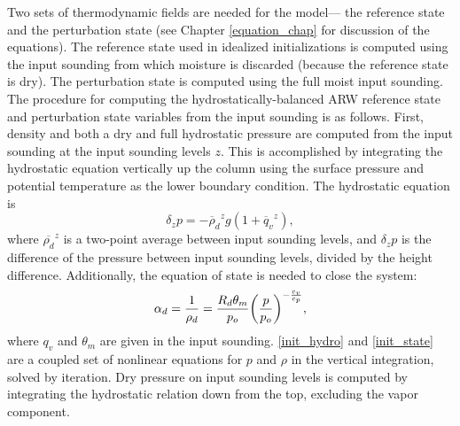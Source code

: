 Two sets of thermodynamic fields are needed for the model--- the
reference state and the perturbation state (see Chapter
\ref{equation_chap} for discussion of the equations).  The
reference state used in idealized initializations is computed using
the input sounding from which moisture is discarded (because the
reference state is dry).  The perturbation state is computed using the full
moist input sounding.  The procedure for computing the hydrostatically-balanced 
ARW reference state and perturbation state variables from the input
sounding is as follows.  First, density and both a dry and full
hydrostatic pressure are computed from the input sounding at the input
sounding levels $z$.  This is accomplished by integrating the
hydrostatic equation vertically up the column using the surface pressure
and potential temperature as the lower boundary condition.  The
hydrostatic equation is
% 
\begin{equation} \delta_z p = - {\overline
\rho_d}^z g (1 + {\overline q_v}^z), 
\label{init_hydro}
\end{equation} 
% 
\noindent
where $\overline{\rho_d}^z$ is a two-point average between input sounding
levels, and $\delta_z p$ is the difference of the pressure between input
sounding levels, divided by the height difference.  Additionally, the
equation of state is needed to close the system:
% 
\begin{equation} \alpha_d = {1 \over \rho_d} = {R_d
\theta_m \over p_o} 
\biggl({p \over p_o}\biggr)^{-{c_v \over c_p}}, 
\label{init_state}
\end{equation}
%
\noindent
where $q_v$ and $\theta_m$ are given in the input sounding.
\eqref{init_hydro} and \eqref{init_state} are a coupled set of nonlinear
equations for $p$ and $\rho$ in the vertical integration, solved by iteration.  
Dry pressure on input sounding levels is
computed by integrating the hydrostatic relation down from the top,
excluding the vapor component.


